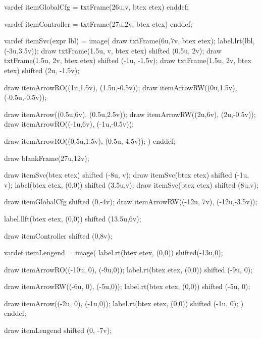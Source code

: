 
vardef itemGlobalCfg =
	txtFrame(26u,v, btex  etex)
enddef;

vardef itemController =
	txtFrame(27u,2v, btex  etex)
enddef;

vardef itemSvc(expr lbl) =
image(
	draw txtFrame(6u,7v, btex \mplabel{} etex);
	label.lrt(lbl, (-3u,3.5v));
	draw txtFrame(1.5u, v, btex  etex) shifted (0.5u, 2v);
	draw txtFrame(1.5u, 2v, btex  etex) shifted (-1u, -1.5v);
	draw txtFrame(1.5u, 2v, btex  etex) shifted (2u, -1.5v);

	draw itemArrowRO((1u,1.5v), (1.5u,-0.5v));
	draw itemArrowRW((0u,1.5v), (-0.5u,-0.5v));

	draw itemArrow((0.5u,6v), (0.5u,2.5v));
	draw itemArrowRW((2u,6v), (2u,-0.5v));
	draw itemArrowRO((-1u,6v), (-1u,-0.5v));

	draw itemArrowRO((0.5u,1.5v), (0.5u,-4.5v));
)
enddef;

draw blankFrame(27u,12v);

draw itemSvc(btex  etex) shifted (-8u, v);
draw itemSvc(btex  etex) shifted (-1u, v);
label(btex \mplabel{\cdots} etex, (0,0))       shifted (3.5u,v);
draw itemSvc(btex  etex) shifted (8u,v);

draw itemGlobalCfg shifted (0,-4v);
draw itemArrowRW((-12u, 7v), (-12u,-3.5v));

label.llft(btex  etex, (0,0)) shifted (13.5u,6v);

draw itemController shifted (0,8v);

vardef itemLengend =
image(
	label.rt(btex  etex, (0,0)) shifted(-13u,0);

	draw itemArrowRO((-10u, 0), (-9u,0));
	label.rt(btex  etex, (0,0)) shifted (-9u, 0);

	draw itemArrowRW((-6u, 0), (-5u,0));
	label.rt(btex  etex, (0,0)) shifted (-5u, 0);

	draw itemArrow((-2u, 0), (-1u,0));
	label.rt(btex  etex, (0,0)) shifted (-1u, 0);
)
enddef;

draw itemLengend shifted (0, -7v);

\stopreusableMPgraphic
